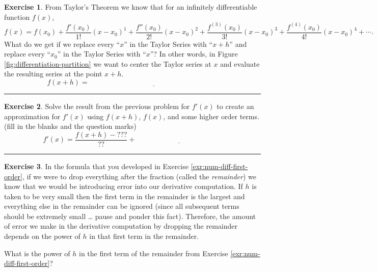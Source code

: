 \documentclass[
]{book}
\theoremstyle{definition}
\theoremstyle{definition}
\theoremstyle{definition}
\newtheorem{exercise}{Exercise}[chapter]
\theoremstyle{remark}
\begin{document}
\begin{exercise}
\protect\hypertarget{exr:unnamed-chunk-143}{}{\label{exr:unnamed-chunk-143} }From Taylor's
Theorem we know that for an infinitely differentiable function \(f(x)\),
\[f(x) = f(x_0) + \frac{f'(x_0)}{1!} (x-x_0)^1 + \frac{f''(x_0)}{2!}(x-x_0)^2 +
        \frac{f^{(3)}(x_0)}{3!}(x-x_0)^3 + \frac{f^{(4)}(x_0)}{4!}(x-x_0)^4 + \cdots.\]
What do we get if we replace every ``\(x\)'' in the Taylor Series with ``\(x+h\)'' and replace every ``\(x_0\)'' in the Taylor Series with ``\(x\)''? In other
words, in Figure \ref{fig:differentiation-partition} we want to center the Taylor
series at \(x\) and evaluate the resulting series at the point \(x+h\).
\[f(x+h) = \underline{\hspace{3in}}\]
\end{exercise}

\begin{center}\rule{0.5\linewidth}{0.5pt}\end{center}

\begin{exercise}
\protect\hypertarget{exr:num-diff-first-order}{}{\label{exr:num-diff-first-order} }Solve the result from the previous problem for \(f'(x)\) to create an approximation for \(f'(x)\) using
\(f(x+h)\), \(f(x)\), and some higher order terms. (fill in the blanks and
the question marks)
\[f'(x) = \frac{f(x+h) - ???}{??} + \underline{\hspace{2in}}\]
\end{exercise}

\begin{center}\rule{0.5\linewidth}{0.5pt}\end{center}

\begin{exercise}
\protect\hypertarget{exr:unnamed-chunk-144}{}{\label{exr:unnamed-chunk-144} }In the formula that you developed in Exercise \ref{exr:num-diff-first-order}, if we were to drop everything after the fraction (called the \emph{remainder}) we know that we would be introducing error into our derivative computation. If \(h\) is taken to be very small then the first term in the remainder is the largest and everything else in the remainder can be ignored (since all subsequent terms should be extremely small \ldots{} pause and ponder this fact). Therefore, the amount of error we make in the derivative computation by dropping the remainder depends on the power of \(h\) in that first term in the remainder.

What is the power of \(h\) in the first term of the remainder from Exercise \ref{exr:num-diff-first-order}?
\end{exercise}
\end{document}
